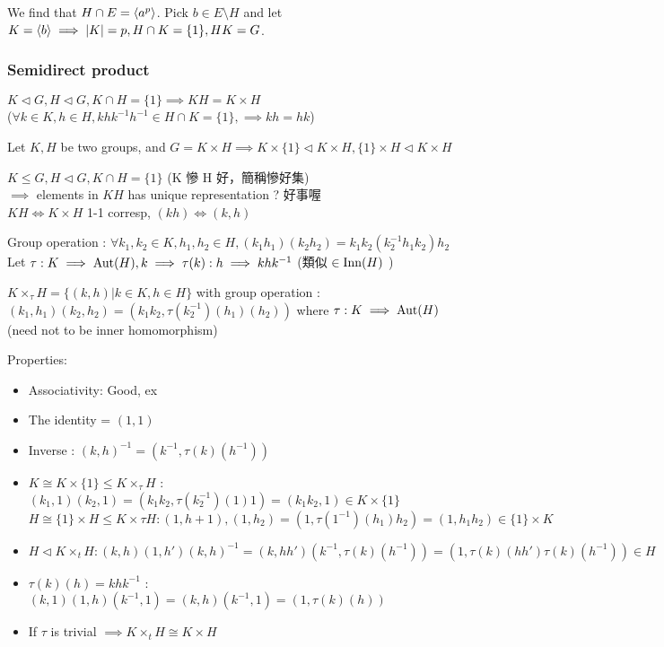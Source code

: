 We find that $H \cap E = \langle a^p\rangle$. Pick $b \in E \setminus H$ and let
$K = \langle b\rangle \implies \lvert K\rvert = p, H \cap K = \{ 1 \}, HK = G$.

\subsubsection{Semidirect product}

\begin{fact}
$K \lhd G, H \lhd G, K \cap H = \{1\} \implies KH = K \times H$ \\
($\forall k\in K, h \in H, khk^{-1} h^{-1} \in H \cap K = \{1\}, \implies kh=hk$)
\end{fact}

\begin{fact}
Let $K, H$ be two groups, and $G=K \times H \implies K \times \{1\} \lhd K \times H, \{1\} \times H \lhd K \times H$
\end{fact}

\begin{observation}
$K \leq G, H \lhd G, K \cap H = \{1\}$ (K 慘 H 好，簡稱慘好集) \\
$\implies$ elements in $KH$ has unique representation ? 好事喔\\
$KH \iff K \times H$ 1-1 corresp, $(kh) \iff (k, h)$
\end{observation}

Group operation :
$\forall k_1, k_2 \in K, h_1, h_2 \in H, (k_1 h_1) (k_2 h_2) = k_1 k_2 (k_2^{-1} h_1 k_2) h_2$ \\
Let $\tau : K \implies \operatorname{Aut}(H), k \implies \tau(k) : h\implies khk^{-1}$ (類似 $\in \operatorname{Inn}(H)$ )

\begin{definition}
  $K \times_{\tau} H = \{(k, h) | k\in K, h \in H\}$ with group operation :
$(k_1, h_1)(k_2, h_2) = (k_1 k_2, \tau(k_2^{-1})(h_1)(h_2))$
where $\tau : K \implies \operatorname{Aut}(H)$  (need not to be inner homomorphism)
\end{definition}

Properties:
\begin{itemize}
  \item Associativity: Good, ex
  \item The identity = $(1, 1)$
  \item Inverse : $(k, h)^{-1} = (k^{-1}, \tau(k)(h^{-1}))$
  \item $K \cong K \times \{1\} \leq K \times_{\tau} H$ :
    $(k_1, 1)(k_2, 1) = (k_1 k_2, \tau(k_2^{-1})(1)1) = (k_1 k_2, 1) \in K \times \{1\}$
    $H \cong \{1\} \times H \leq K \times{\tau} H : (1, h+1), (1, h_2) = (1, \tau(1^{-1})(h_1)h_2) = (1, h_1 h_2) \in \{1\} \times K $
  \item $H \lhd K \times_t H : (k, h) (1, h')(k, h)^{-1} = (k, hh')(k^{-1}, \tau(k)(h^{-1}))
    = (1, \tau(k)(hh')\tau(k)(h^{-1})) \in H$

  \item $\tau(k)(h) = khk^{-1}$ :
    $(k, 1)(1, h)(k^{-1}, 1) = (k, h)(k^{-1}, 1) = (1, \tau(k)(h))$
  \item If $\tau$ is trivial $\implies K \times_t H \cong K \times H$
\end{itemize}


